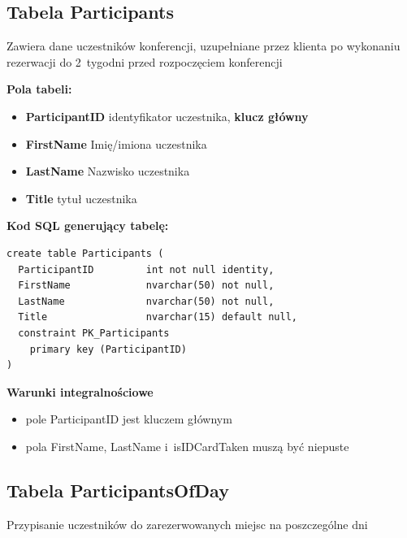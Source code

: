 \documentclass[12pt, a4paper]{mwrep}
\begin{document}
\subsection{Tabela Participants}

\noindent Zawiera dane uczestników konferencji, uzupełniane przez klienta po wykonaniu rezerwacji do 2~tygodni przed rozpoczęciem konferencji

\vspace{0.5cm}

\noindent \textbf{Pola tabeli:}
\begin{itemize}
  \item \textbf{ParticipantID} \ppauza identyfikator uczestnika, \textbf{klucz główny}
  \item \textbf{FirstName} \ppauza Imię/imiona uczestnika
  \item \textbf{LastName} \ppauza Nazwisko uczestnika
  \item \textbf{Title} \ppauza tytuł uczestnika
\end{itemize}

\vspace{0.5cm}
\noindent \textbf{Kod SQL generujący tabelę:}

\begin{lstlisting}
create table Participants (
  ParticipantID         int not null identity,
  FirstName             nvarchar(50) not null,
  LastName              nvarchar(50) not null,
  Title                 nvarchar(15) default null,
  constraint PK_Participants 
    primary key (ParticipantID)
)
\end{lstlisting}

\vspace{0.5cm}
\noindent \textbf{Warunki integralnościowe}
\begin{itemize}
  \item pole ParticipantID jest kluczem głównym
  \item pola FirstName, LastName i~isIDCardTaken muszą być niepuste
\end{itemize}

\subsection{Tabela ParticipantsOfDay}

\noindent Przypisanie uczestników do zarezerwowanych miejsc na poszczególne dni

\vspace{0.5cm}
\end{document}
